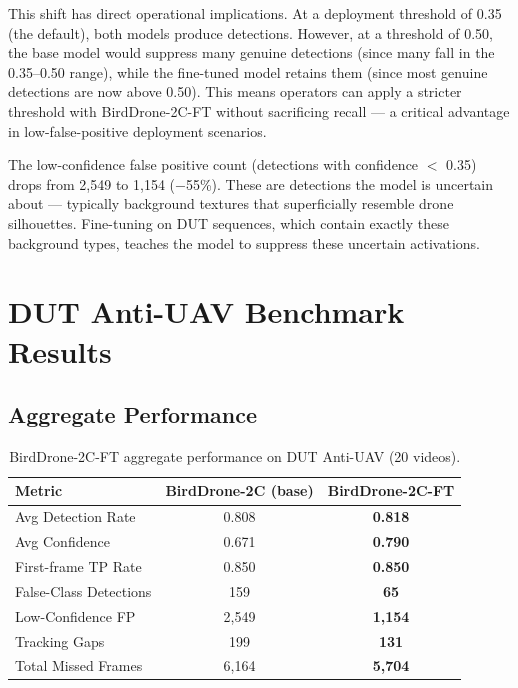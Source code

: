 \documentclass[12pt,a4paper]{report}
\begin{document}
This shift has direct operational implications. At a deployment threshold
of 0.35 (the default), both models produce detections. However, at a
threshold of 0.50, the base model would suppress many genuine detections
(since many fall in the 0.35--0.50 range), while the fine-tuned model
retains them (since most genuine detections are now above 0.50). This
means operators can apply a stricter threshold with BirdDrone-2C-FT
without sacrificing recall --- a critical advantage in low-false-positive
deployment scenarios.

The low-confidence false positive count (detections with confidence $<$ 0.35)
drops from 2,549 to 1,154 ($-$55\%). These are detections the model is
uncertain about --- typically background textures that superficially resemble
drone silhouettes. Fine-tuning on DUT sequences, which contain exactly these
background types, teaches the model to suppress these uncertain activations.

\section{DUT Anti-UAV Benchmark Results}

\subsection{Aggregate Performance}

\begin{table}[H]
\centering
\caption{BirdDrone-2C-FT aggregate performance on DUT Anti-UAV (20 videos).}
\label{tab:dut_agg}
\begin{tabular}{|l|c|c|}
\hline
\textbf{Metric} & \textbf{BirdDrone-2C (base)} & \textbf{BirdDrone-2C-FT} \\
\hline
Avg Detection Rate    & 0.808 & \textbf{0.818} \\
\hline
Avg Confidence        & 0.671 & \textbf{0.790} \\
\hline
First-frame TP Rate   & 0.850 & \textbf{0.850} \\
\hline
False-Class Detections & 159  & \textbf{65} \\
\hline
Low-Confidence FP     & 2,549 & \textbf{1,154} \\
\hline
Tracking Gaps         & 199   & \textbf{131} \\
\hline
Total Missed Frames   & 6,164 & \textbf{5,704} \\
\hline
\end{tabular}
\end{table}
\end{document}
